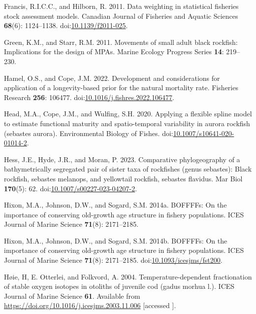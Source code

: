 \documentclass[11pt,
  letterpaper,
]{article}
\newlength{\cslhangindent}
\newenvironment{CSLReferences}[2] %
 {%
  \setlength{\parindent}{0pt}
  \ifodd #1 \everypar{\setlength{\hangindent}{\cslhangindent}}\ignorespaces\fi
  \ifnum #2 > 0
  \setlength{\parskip}{#2\baselineskip}
  \fi
 }%
 {}
\begin{document}
\begin{CSLReferences}{1}{0}
\leavevmode{}%
Francis, R.I.C.C., and Hilborn, R. 2011. Data weighting in statistical fisheries stock assessment models. Canadian Journal of Fisheries and Aquatic Sciences \textbf{68}(6): 1124--1138. doi:\href{https://doi.org/10.1139/f2011-025}{10.1139/f2011-025}.

\leavevmode{}%
Green, K.M., and Starr, R.M. 2011. Movements of small adult black rockfish: Implications for the design of MPAs. Marine Ecology Progress Series \textbf{14}: 219--230.

\leavevmode{}%
Hamel, O.S., and Cope, J.M. 2022. Development and considerations for application of a longevity-based prior for the natural mortality rate. Fisheries Research \textbf{256}: 106477. doi:\href{https://doi.org/10.1016/j.fishres.2022.106477}{10.1016/j.fishres.2022.106477}.

\leavevmode{}%
Head, M.A., Cope, J.M., and Wulfing, S.H. 2020. Applying a flexible spline model to estimate functional maturity and spatio-temporal variability in aurora rockfish (sebastes aurora). Environmental Biology of Fishes. doi:\href{https://doi.org/10.1007/s10641-020-01014-2}{10.1007/s10641-020-01014-2}.

\leavevmode{}%
Hess, J.E., Hyde, J.R., and Moran, P. 2023. Comparative phylogeography of a bathymetrically segregated pair of sister taxa of rockfishes (genus sebastes): Black rockfish, sebastes melanops, and yellowtail rockfish, sebastes flavidus. Mar Biol \textbf{170}(5): 62. doi:\href{https://doi.org/10.1007/s00227-023-04207-2}{10.1007/s00227-023-04207-2}.

\leavevmode{}%
Hixon, M.A., Johnson, D.W., and Sogard, S.M. 2014a. BOFFFFs: On the importance of conserving old-growth age structure in fishery populations. ICES Journal of Marine Science \textbf{71}(8): 2171--2185.

\leavevmode{}%
Hixon, M.A., Johnson, D.W., and Sogard, S.M. 2014b. {BOFFFFs}: On the importance of conserving old-growth age structure in fishery populations. {ICES} Journal of Marine Science \textbf{71}(8): 2171--2185. doi:\href{https://doi.org/10.1093/icesjms/fst200}{10.1093/icesjms/fst200}.

\leavevmode{}%
Høie, H, E. Otterlei, and Folkvord, A. 2004. Temperature-dependent fractionation of stable oxygen isotopes in otoliths of juvenile cod (gadus morhua l.). ICES Journal of Marine Science \textbf{61}. Available from \url{https://doi.org/10.1016/j.icesjms.2003.11.006} {[}accessed {]}.


\end{CSLReferences}
\end{document}
